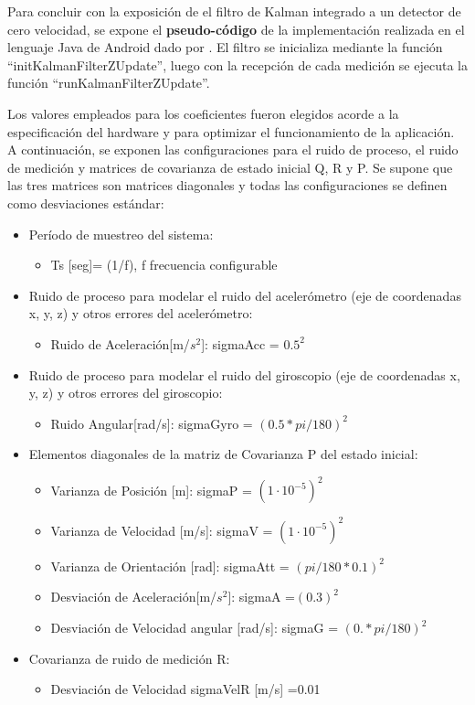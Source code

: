 Para concluir con la exposición de el filtro de Kalman integrado a un detector de cero velocidad, se expone el \textbf{pseudo-código} de la implementación realizada en el lenguaje Java de Android dado por . El filtro se inicializa mediante la función ``initKalmanFilterZUpdate'', luego con la recepción de cada medición se ejecuta la función ``runKalmanFilterZUpdate''.

Los valores empleados para los coeficientes fueron elegidos acorde a la especificación del hardware y para optimizar el funcionamiento de la aplicación. A continuación, se exponen las configuraciones para el ruido de proceso, el ruido de medición y matrices de covarianza de estado inicial Q, R y P. Se supone que las tres matrices son matrices diagonales y todas las configuraciones se definen como desviaciones estándar:

\begin{itemize}
    \item Período de muestreo del sistema:
    \begin{itemize}
        \item Ts [seg]= (1/f), f frecuencia configurable 
    \end{itemize}
    \item Ruido de proceso para modelar el ruido del acelerómetro (eje de coordenadas x, y, z) y otros errores del acelerómetro:
    \begin{itemize}
        \item Ruido de Aceleración[m/$s^2$]: sigmaAcc = $0.5^{2}$
    \end{itemize}
    \item Ruido de proceso para modelar el ruido del giroscopio (eje de coordenadas x, y, z) y otros errores del giroscopio:
    \begin{itemize}
        \item Ruido Angular[rad/s]: sigmaGyro = $(0.5*pi/180)^{2}$ 
    \end{itemize}
    \item Elementos diagonales de la matriz de Covarianza P del estado inicial:
     \begin{itemize}
        \item Varianza de Posición [m]: sigmaP = $(1\cdot10^{-5})^{2}$ 
        \item Varianza de Velocidad [m/s]: sigmaV = $(1\cdot10^{-5})^{2}$
        \item Varianza de Orientación [rad]: sigmaAtt = $(pi/180*0.1)^{2}$
        \item Desviación de Aceleración[m/$s^2$]: sigmaA =$(0.3)^{2}$
        \item Desviación de Velocidad angular [rad/s]: sigmaG = $(0.*pi/180)^{2}$ 
    \end{itemize}
    \item Covarianza de ruido de medición R:
    \begin{itemize}
        \item Desviación de Velocidad sigmaVelR [m/s] =0.01
    \end{itemize}
    
\end{itemize}

